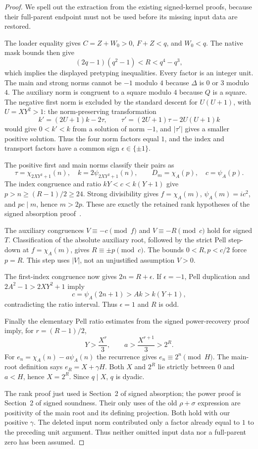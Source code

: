 \documentclass[11pt]{article}
\theoremstyle{remark}\newtheorem{remark}[theorem]{Remark}
\begin{document}
\begin{proof}
We spell out the extraction from the existing signed-kernel proofs, because their full-parent endpoint must not be used before its missing input data are restored.

The loader equality gives $C=Z+W_0>0$, $F+Z<q$, and $W_0<q$. The native mask bounds then give
\[
 (2q-1)(q^2-1)<R<q^4-q^3,
\]
which implies the displayed pretyping inequalities. Every factor is an integer unit. The main and strong norms cannot be $-1$ modulo $4$ because $\Delta$ is $0$ or $3$ modulo $4$. The auxiliary norm is congruent to a square modulo $4$ because $Q$ is a square. The negative first norm is excluded by the standard descent for $U(U+1)$, with $U=XY^2>1$: the norm-preserving transformation
\[
 k'=(2U+1)k-2\tau,\qquad
 \tau'=(2U+1)\tau-2U(U+1)k
\]
would give $0<k'<k$ from a solution of norm $-1$, and $|\tau'|$ gives a smaller positive solution. Thus the four norm factors equal $1$, and the index and transport factors have a common sign $\epsilon\in\{\pm1\}$.

The positive first and main norms classify their pairs as
\[
 \tau=\chi_{2XY^2+1}(n),\quad k=2\psi_{2XY^2+1}(n),
 \qquad D_m=\chi_A(p),\quad c=\psi_A(p).
\]
The index congruence and ratio $kY<c<k(Y+1)$ give $p>n\ge(R-1)/2\ge24$. Strong divisibility gives $f=\chi_A(m)$, $\psi_A(m)=ic^2$, and $pc\mid m$, hence $m>2p$. These are exactly the retained rank hypotheses of the signed absorption proof~\cite{SignedAbsorption}.

The auxiliary congruences $V\equiv-c\pmod f$ and $V\equiv-R\pmod c$ hold for signed $T$. Classification of the absolute auxiliary root, followed by the strict Pell step-down at $f=\chi_A(m)$, gives $R\equiv\pm p\pmod c$. The bounds $0<R,p<c/2$ force $p=R$. This step uses $|V|$, not an unjustified assumption $V>0$.

The first-index congruence now gives $2n=R+\epsilon$. If $\epsilon=-1$, Pell duplication and $2A^2-1>2XY^2+1$ imply
\[
 c=\psi_A(2n+1)>A k>k(Y+1),
\]
contradicting the ratio interval. Thus $\epsilon=1$ and $R$ is odd.

Finally the elementary Pell ratio estimates from the signed power-recovery proof~\cite{SignedSoundness} imply, for $r=(R-1)/2$,
\[
 Y>\frac{X^r}{3},\qquad a>\frac{X^{r+1}}3>2^R.
\]
For $e_n=\chi_A(n)-a\psi_A(n)$ the recurrence gives $e_n\equiv2^n\pmod H$. The main-root definition says $e_R=X+\gamma H$. Both $X$ and $2^R$ lie strictly between $0$ and $a<H$, hence $X=2^R$. Since $q\mid X$, $q$ is dyadic.

The rank proof just used is Section~2 of signed absorption; the power proof is Section~2 of signed soundness. Their only uses of the old $\rho+\sigma$ expression are positivity of the main root and its defining projection. Both hold with our positive $\gamma$. The deleted input norm contributed only a factor already equal to $1$ to the preceding unit argument. Thus neither omitted input data nor a full-parent zero has been assumed.
\end{proof}
\end{document}

